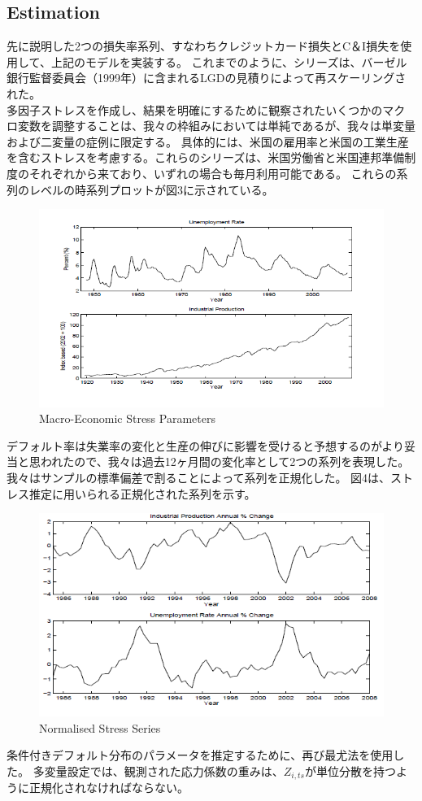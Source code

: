 \documentclass[a4j,12pt]{jarticle}
\begin{document}
\subsection{Estimation}
先に説明した2つの損失率系列、すなわちクレジットカード損失とC＆I損失を使用して、上記のモデルを実装する。 これまでのように、シリーズは、バーゼル銀行監督委員会（1999年）に含まれるLGDの見積りによって再スケーリングされた。\\
多因子ストレスを作成し、結果を明確にするために観察されたいくつかのマクロ変数を調整することは、我々の枠組みにおいては単純であるが、我々は単変量および二変量の症例に限定する。 具体的には、米国の雇用率と米国の工業生産を含むストレスを考慮する。これらのシリーズは、米国労働省と米国連邦準備制度のそれぞれから来ており、いずれの場合も毎月利用可能である。 これらの系列のレベルの時系列プロットが図3に示されている。
\begin{figure}[H]
\includegraphics{figure/ch3.png}
\caption{Macro-Economic Stress Parameters}
\end{figure}
デフォルト率は失業率の変化と生産の伸びに影響を受けると予想するのがより妥当と思われたので、我々は過去12ヶ月間の変化率として2つの系列を表現した。 我々はサンプルの標準偏差で割ることによって系列を正規化した。 図4は、ストレス推定に用いられる正規化された系列を示す。
\begin{figure}[H]
\includegraphics{figure/ch4.png}
\caption{Normalised Stress Series}
\end{figure}
条件付きデフォルト分布のパラメータを推定するために、再び最尤法を使用した。 多変量設定では、観測された応力係数の重みは、$Z_{i,ts}$が単位分散を持つように正規化されなければならない。
\end{document}
